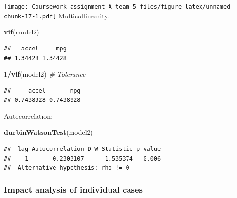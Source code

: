 \documentclass[]{article}
\newenvironment{Shaded}{\begin{snugshade}}{\end{snugshade}}
\newcommand{\KeywordTok}[1]{\textcolor[rgb]{0.13,0.29,0.53}{\textbf{#1}}}
\newcommand{\DecValTok}[1]{\textcolor[rgb]{0.00,0.00,0.81}{#1}}
\newcommand{\CommentTok}[1]{\textcolor[rgb]{0.56,0.35,0.01}{\textit{#1}}}
\newcommand{\OperatorTok}[1]{\textcolor[rgb]{0.81,0.36,0.00}{\textbf{#1}}}
\newcommand{\NormalTok}[1]{#1}
\begin{document}
\texttt{[image: Coursework\_assignment\_A-team\_5\_files/figure-latex/unnamed-chunk-17-1.pdf]}
Multicollinearity:

\begin{Shaded}
\begin{Highlighting}[]
\KeywordTok{vif}\NormalTok{(model2)}
\end{Highlighting}
\end{Shaded}

\begin{verbatim}
##   accel     mpg 
## 1.34428 1.34428
\end{verbatim}

\begin{Shaded}
\begin{Highlighting}[]
\DecValTok{1}\OperatorTok{/}\KeywordTok{vif}\NormalTok{(model2) }\CommentTok{# Tolerance}
\end{Highlighting}
\end{Shaded}

\begin{verbatim}
##     accel       mpg 
## 0.7438928 0.7438928
\end{verbatim}

Autocorrelation:

\begin{Shaded}
\begin{Highlighting}[]
\KeywordTok{durbinWatsonTest}\NormalTok{(model2)}
\end{Highlighting}
\end{Shaded}

\begin{verbatim}
##  lag Autocorrelation D-W Statistic p-value
##    1       0.2303107      1.535374   0.006
##  Alternative hypothesis: rho != 0
\end{verbatim}

\subsubsection{Impact analysis of individual
cases}\label{impact-analysis-of-individual-cases}

\begin{Shaded}
\end{Shaded}
\end{document}
